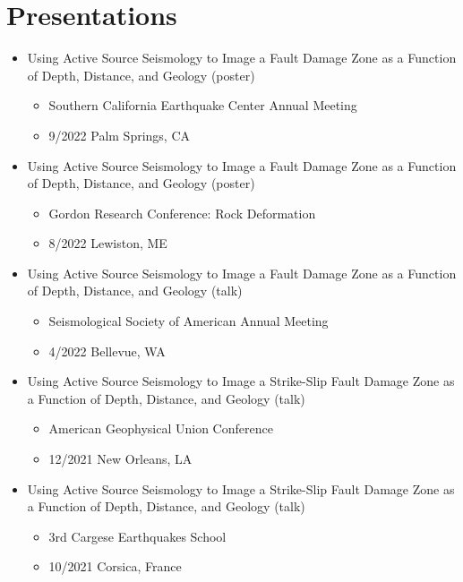 \documentclass[11pt]{article}
\begin{document}
\section{Presentations}
\label{sec:org8e01b9a}
\begin{itemize}
\item Using Active Source Seismology to Image a Fault Damage Zone as a Function of Depth, Distance, and Geology (poster)
\begin{itemize}
\item Southern California Earthquake Center Annual Meeting
\item 9/2022 Palm Springs, CA
\end{itemize}

\item Using Active Source Seismology to Image a Fault Damage Zone as a Function of Depth, Distance, and Geology (poster)
\begin{itemize}
\item Gordon Research Conference: Rock Deformation
\item 8/2022 Lewiston, ME
\end{itemize}

\item Using Active Source Seismology to Image a Fault Damage Zone as a Function of Depth, Distance, and Geology (talk)
\begin{itemize}
\item Seismological Society of American Annual Meeting
\item 4/2022 Bellevue, WA
\end{itemize}

\item Using Active Source Seismology to Image a Strike-Slip Fault Damage Zone as a Function of Depth, Distance, and Geology (talk)
\begin{itemize}
\item American Geophysical Union Conference
\item 12/2021 New Orleans, LA
\end{itemize}

\item Using Active Source Seismology to Image a Strike-Slip Fault Damage Zone as a Function of Depth, Distance, and Geology (talk)
\begin{itemize}
\item 3rd Cargese Earthquakes School
\item 10/2021 Corsica, France
\end{itemize}


\end{itemize}
\end{document}

